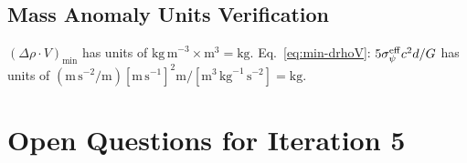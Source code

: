 \documentclass[aps,prd,twocolumn,superscriptaddress,nofootinbib]{revtex4-2}
\newcommand{\drho}{\Delta\rho}
\begin{document}
\subsection{Mass Anomaly Units Verification}

$(\drho\cdot V)_{\min}$ has units of $\mathrm{kg\,m}^{-3}\times\mathrm{m}^3
= \mathrm{kg}$.  Eq.~\eqref{eq:min-drhoV}:
$5\sigma_\psi^{\rm eff} c^2 d/G$ has units of
$(\mathrm{m\,s}^{-2}/\mathrm{m})[\mathrm{m\,s}^{-1}]^2 \mathrm{m}
/ [\mathrm{m}^3\,\mathrm{kg}^{-1}\,\mathrm{s}^{-2}]
= \mathrm{kg}$. \checkmark

\section{Open Questions for Iteration 5}
\label{sec:open}
\end{document}
